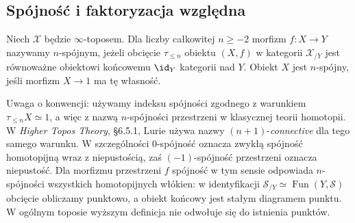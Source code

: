 \subsection{Spójność i faktoryzacja względna}

\begin{definicja}\label{cat:def:infty-topos-connected}
Niech $\mathcal X$ będzie $\infty$-toposem. Dla liczby całkowitej $n\geq-2$ morfizm $f:X\to Y$ nazywamy $n$-spójnym, jeżeli obcięcie $\tau_{\leq n}$ obiektu $(X,f)$ w kategorii $\mathcal X_{/Y}$ jest równoważne obiektowi końcowemu $\id_Y$ kategorii nad $Y$. Obiekt $X$ jest $n$-spójny, jeśli morfizm $X\to1$ ma tę własność.
\end{definicja}

Uwaga o konwencji: używamy indeksu spójności zgodnego z warunkiem $\tau_{\leq n}X\simeq1$, a więc z nazwą $n$-spójności przestrzeni w klasycznej teorii homotopii. W \emph{Higher Topos Theory}, \S6.5.1, Lurie używa nazwy $(n+1)$-\emph{connective} dla tego samego warunku. W szczególności $0$-spójność oznacza zwykłą spójność homotopijną wraz z niepustością, zaś $(-1)$-spójność przestrzeni oznacza niepustość. Dla morfizmu przestrzeni $f$ spójność w tym sensie odpowiada $n$-spójności wszystkich homotopijnych włókien: w identyfikacji $\mathcal S_{/Y}\simeq\operatorname{Fun}(Y,\mathcal S)$ obcięcie obliczamy punktowo, a obiekt końcowy jest stałym diagramem punktu. W ogólnym toposie wyższym definicja nie odwołuje się do istnienia punktów.

